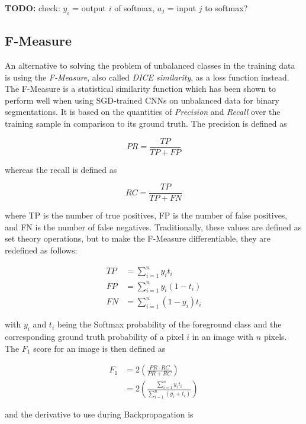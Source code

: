 \textbf{TODO:} check: $y_i$ = output $i$ of softmax, $a_j$ = input $j$ to softmax?\\




		\subsection{F-Measure}
\label{subsec:fmeasure}

An alternative to solving the problem of unbalanced classes in the training data is using the \textit{F-Measure}, also called \textit{DICE similarity}, as a loss function instead. The F-Measure is a statistical similarity function which has been shown to perform well when using SGD-trained CNNs on unbalanced data for binary segmentations. \cite{fmeasure3, fmeasure4, fmeasure5} It is based on the quantities of \textit{Precision} and \textit{Recall} over the training sample in comparison to its ground truth. The precision is defined as

\[ PR = \frac{TP}{TP + FP} \]

\noindent whereas the recall is defined as

\[ RC = \frac{TP}{TP + FN} \]

\noindent where TP is the number of true positives, FP is the number of false positives, and FN is the number of false negatives. Traditionally, these values are defined as set theory operations, but to make the F-Measure differentiable, they are redefined as follows:

\begin {align}
TP &= \sum \limits_{i=1}^{n} y_i t_i \\
FP &= \sum  \limits_{i=1}^{n} y_i (1 - t_i) \\
FN &= \sum \limits_{i=1}^{n} (1 - y_i) t_i
\end {align}

\noindent with $y_i$ and $t_i$ being the Softmax probability of the foreground class and the corresponding ground truth probability of a pixel $i$ in an image with $n$ pixels. The $F_1$ score for an image is then defined as

\begin {align}
 	F_1 &= 2 \left ( \frac{PR \cdot RC}{PR + RC} \right ) \\
		&= 2 \left ( \frac{\sum_{i=1}^{n} y_i t_i }{ \sum_{i=1}^{n} (y_i + t_i) } \right )
\end {align}

\noindent and the derivative to use during Backpropagation is

